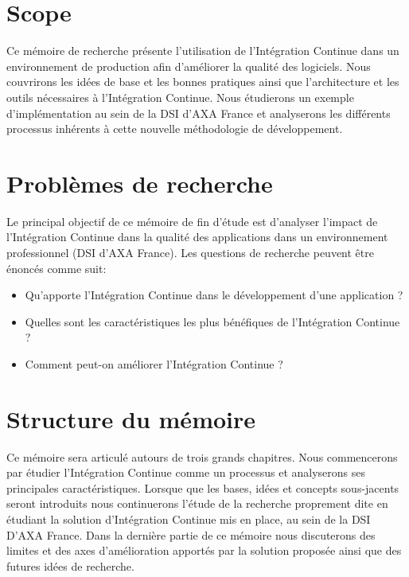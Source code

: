 \documentclass{report}
\begin{document}
    \section{Scope}
    Ce mémoire de recherche présente l'utilisation de l'Intégration Continue dans un environnement de production afin d'améliorer la qualité des logiciels. Nous couvrirons les idées de base et les bonnes pratiques ainsi que l'architecture et les outils nécessaires à l'Intégration Continue. Nous étudierons un exemple d'implémentation au sein de la DSI d'AXA France et analyserons les différents processus inhérents à cette nouvelle méthodologie de développement.

    \section{Problèmes de recherche}
    Le principal objectif de ce mémoire de fin d'étude est d'analyser l'impact de l'Intégration Continue dans la qualité des applications dans un environnement professionnel (DSI d'AXA France). Les questions de recherche peuvent être énoncés comme suit:\\
    \begin{itemize}
      \item Qu'apporte l'Intégration Continue dans le développement d'une application ?
      \item Quelles sont les caractéristiques les plus bénéfiques de l'Intégration Continue ?
      \item Comment peut-on améliorer l'Intégration Continue ?\\
    \end{itemize}

    \section{Structure du mémoire}
    Ce mémoire sera articulé autours de trois grands chapitres. Nous commencerons par étudier l'Intégration Continue comme un processus et analyserons ses principales caractéristiques. Lorsque que les bases, idées et concepts sous-jacents seront introduits nous continuerons l'étude de la recherche proprement dite en étudiant la solution d'Intégration Continue mis en place, au sein de la DSI D'AXA France. Dans la dernière partie de ce mémoire nous discuterons des limites et des axes d'amélioration apportés par la solution proposée ainsi que des futures idées de recherche.


  

  

  

  \listoffigures                  %
  \appendix
  \label{CloudComputing}
\end{document}
